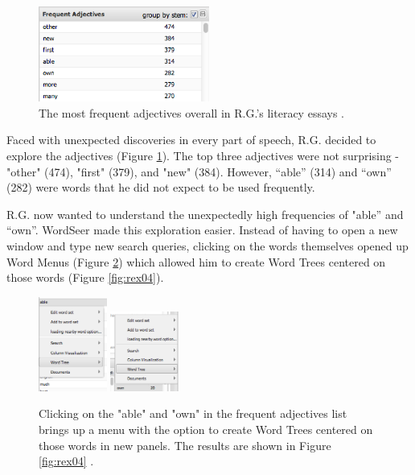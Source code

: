 \documentclass{sig-alternate}
\begin{document}
\begin{figure}
\includegraphics[width=0.5\textwidth]{fig/rex/02.png}
\caption{The most frequent adjectives overall in R.G.'s literacy essays \label{fig:rex02}.}
\end{figure}

Faced with unexpected discoveries in every part of speech, R.G. decided to explore the adjectives (Figure \ref{fig:rex02}). The top three adjectives were not surprising - "other" (474), "first" (379), and "new" (384).  However,  ``able'' (314) and ``own'' (282) were words that he did not expect to be used frequently.

R.G. now wanted to understand the unexpectedly high frequencies of "able'' and ``own''. WordSeer made this exploration easier. Instead of having to open a new window and type new search queries, clicking on the words themselves opened up Word Menus (Figure \ref{fig:rex03}) which allowed him to create Word Trees centered on those words (Figure \ref{fig:rex04}).   
\begin{figure}[h!]
\includegraphics[width=0.2\textwidth]{fig/rex/03.png}
\includegraphics[width=0.2\textwidth]{fig/rex/03b.png}
\caption{Clicking on the "able" and "own" in the frequent adjectives list brings up a menu with the option to create Word Trees centered on those words in new panels. The results are shown in Figure \ref{fig:rex04} \label{fig:rex03}.}
\end{figure}
\end{document}
